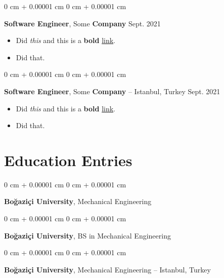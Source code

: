 \documentclass[10pt, letterpaper]{article}
\newenvironment{highlights}{
    \begin{itemize}[
        topsep=0.10 cm,
        parsep=0.10 cm,
        partopsep=0pt,
        itemsep=0pt,
        leftmargin=0 cm + 10pt
    ]
}{
    \end{itemize}
        
    \vspace{-0.20cm}
} %
\newenvironment{onecolentry}{
    \begin{adjustwidth}{
        0 cm + 0.00001 cm
    }{
        0 cm + 0.00001 cm
    }
}{
    \end{adjustwidth}
} %
\begin{document}
        \begin{onecolentry}
            \textbf{Software Engineer}, Some \textbf{Company} \hfill Sept. 2021
            \begin{highlights}
                \item Did \textit{this} and this is a \textbf{bold} \href{https://example.com}{link}.
                \item Did that.
            \end{highlights}
        \end{onecolentry}

        \vspace{0.1 cm}

        \begin{onecolentry}
            \textbf{Software Engineer}, Some \textbf{Company} -- Istanbul, Turkey \hfill Sept. 2021
            \begin{highlights}
                \item Did \textit{this} and this is a \textbf{bold} \href{https://example.com}{link}.
                \item Did that.
            \end{highlights}
        \end{onecolentry}


    
    \section{Education Entries}

        
        \begin{onecolentry}
            \textbf{Boğaziçi University}, Mechanical Engineering \hfill 
        \end{onecolentry}

        \vspace{0.1 cm}

        \begin{onecolentry}
            \textbf{Boğaziçi University}, BS in Mechanical Engineering \hfill 
        \end{onecolentry}

        \vspace{0.1 cm}

        \begin{onecolentry}
            \textbf{Boğaziçi University}, Mechanical Engineering -- Istanbul, Turkey \hfill 
        \end{onecolentry}
\end{document}
